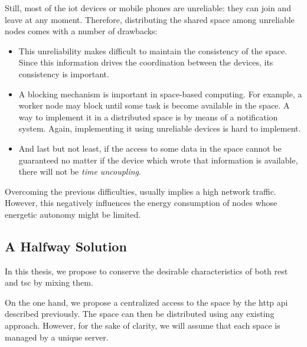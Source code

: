 Still, most of the \ac{iot} devices or mobile phones are unreliable: they can join and leave at any moment.
Therefore, distributing the shared space among unreliable nodes comes with a number of drawbacks:
\begin{itemize}
  \item This unreliability makes difficult to maintain the consistency of the space. %
        Since this information drives the coordination between the devices, its consistency is important.
  \item A blocking mechanism is important in space-based computing.
        For example, a worker node may block until some task is become available in the space.
        A way to implement it in a distributed space is by means of a notification system.
        Again, implementing it using unreliable devices is hard to implement. %
  \item And last but not least, if the access to some data in the space cannot be guaranteed no matter if the device which wrote that information is available, there will not be \emph{time uncoupling}.
\end{itemize}
Overcoming the previous difficulties, usually implies a high network traffic.
However, this negatively influences the energy consumption of nodes whose energetic autonomy might be limited.


\subsection{A Halfway Solution}
\label{sec:halfway_solution}

In this thesis, we propose to conserve the desirable characteristics of both \ac{rest} and \ac{tsc} by mixing them.

On the one hand, we propose a centralized access to the space by the \acs{http} \ac{api} described previously.
The space can then be distributed using any existing approach. %
However, for the sake of clarity, we will assume that each space is managed by a unique server.

